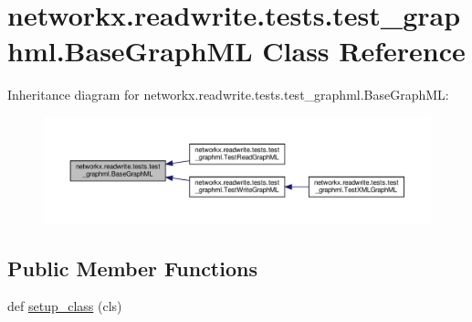 \hypertarget{classnetworkx_1_1readwrite_1_1tests_1_1test__graphml_1_1BaseGraphML}{}\section{networkx.\+readwrite.\+tests.\+test\+\_\+graphml.\+Base\+Graph\+ML Class Reference}
\label{classnetworkx_1_1readwrite_1_1tests_1_1test__graphml_1_1BaseGraphML}


Inheritance diagram for networkx.\+readwrite.\+tests.\+test\+\_\+graphml.\+Base\+Graph\+ML\+:
\nopagebreak
\begin{figure}[H]
\begin{center}
\leavevmode
\includegraphics[width=350pt]{classnetworkx_1_1readwrite_1_1tests_1_1test__graphml_1_1BaseGraphML__inherit__graph}
\end{center}
\end{figure}
\subsection*{Public Member Functions}
\begin{DoxyCompactItemize}
\item 
def \hyperlink{classnetworkx_1_1readwrite_1_1tests_1_1test__graphml_1_1BaseGraphML_a7ba4483f4c7fa417c867278d3b721b92}{setup\+\_\+class} (cls)
\end{DoxyCompactItemize}
